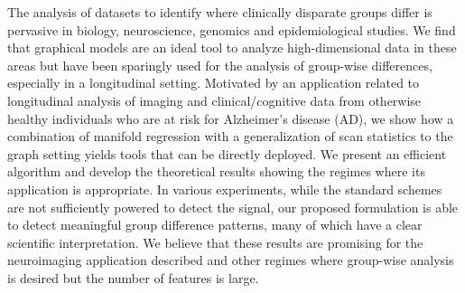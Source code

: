 The analysis of datasets to identify where clinically disparate groups differ is pervasive in biology, neuroscience, genomics and epidemiological studies. 
We find that graphical models are an ideal tool to analyze high-dimensional data in these areas but have been sparingly used for the analysis of 
group-wise differences, especially in a longitudinal setting. 
Motivated by an application related to longitudinal analysis of imaging and clinical/cognitive data from otherwise healthy individuals 
who are at risk for Alzheimer's disease (AD), we show how a combination of manifold regression with a generalization of scan statistics to the graph setting yields 
tools that can be directly deployed. 
We present an efficient algorithm and develop the theoretical results showing the regimes where its application is appropriate. 
In various experiments, while the standard schemes are not sufficiently powered to detect the signal, our proposed formulation is able to 
detect meaningful group difference patterns, many of which have a clear scientific interpretation. 
We believe that these results are promising for the neuroimaging application 
described and other regimes where group-wise analysis is desired but the number of features is large. 
